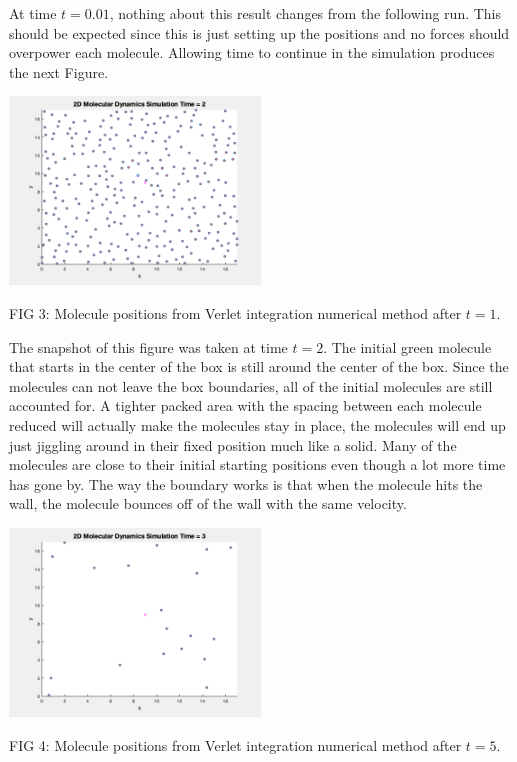 \documentclass[reprint,amsmath,amssymb, aps, 10pt, a4paper, english, reqno]{revtex4-1}
\begin{document}
\begin{multicols}{2}
At time $t = 0.01$, nothing about this result changes from the following run. This should be expected since this is just setting up the positions and no forces should overpower each molecule. Allowing time to continue in the simulation produces the next Figure. 

\begin{center}
    \includegraphics[width=0.50\textwidth]{position_n_289_t_2_bc.png}
    \caption{\small FIG 3: Molecule positions from Verlet integration numerical method after $t = 1$.}
\end{center}

The snapshot of this figure was taken at time $t = 2$. The initial green molecule that starts in the center of the box is still around the center of the box. Since the molecules can not leave the box boundaries, all of the initial molecules are still accounted for. A tighter packed area with the spacing between each molecule reduced will actually make the molecules stay in place, the molecules will end up just jiggling around in their fixed position much like a solid. Many of the molecules are close to their initial starting positions even though a lot more time has gone by. The way the boundary works is that when the molecule hits the wall, the molecule bounces off of the wall with the same velocity. 

\begin{center}
    \includegraphics[width=0.50\textwidth]{position_n_289_t_3_bc.png}
    \caption{\small FIG 4: Molecule positions from Verlet integration numerical method after $t = 5$.}
\end{center}


\end{multicols}
\end{document}
